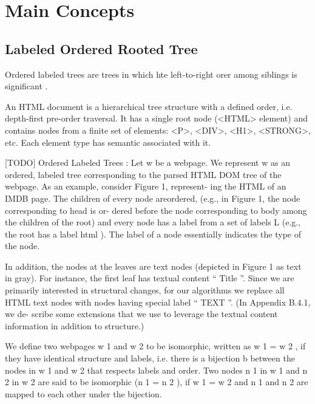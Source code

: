 \chapter{Main Concepts}


\section{Labeled Ordered Rooted Tree}

Ordered labeled trees are trees in which hte left-to-right orer among siblings is significant \cite{shasha1990a}.

An HTML document is a hierarchical tree structure with a defined order, i.e. depth-first pre-order traversal. It has a single root node (<HTML> element) and contains nodes from a finite set of elements: <P>, <DIV>, <H1>, <STRONG>, etc. Each element type has semantic associated with it.

[TODO] Ordered Labeled Trees : Let w be a webpage. We represent w as an ordered, labeled tree corresponding to the parsed HTML DOM tree of the webpage. As an example, consider Figure 1, represent- ing the HTML of an IMDB page. The children of every node areordered, (e.g., in Figure 1, the node corresponding to head is or- dered before the node corresponding to body among the children of the root) and every node has a label from a set of labels L (e.g., the root has a label html ). The label of a node essentially indicates the type of the node.

In addition, the nodes at the leaves are text nodes (depicted in Figure 1 as text in gray). For instance, the first leaf has textual content “ Title ”. Since we are primarily interested in structural changes, for our algorithms we replace all HTML text nodes with nodes having special label “ TEXT ”. (In Appendix B.4.1, we de- scribe some extensions that we use to leverage the textual content information in addition to structure.)

We define two webpages w 1 and w 2 to be isomorphic, written as w 1 = w 2 , if they have identical structure and labels, i.e. there is a bijection b between the nodes in w 1 and w 2 that respects labels and order. Two nodes n 1 in w 1 and n 2 in w 2 are said to be isomorphic (n 1 = n 2 ), if w 1 = w 2 and n 1 and n 2 are mapped to each other under the bijection.

